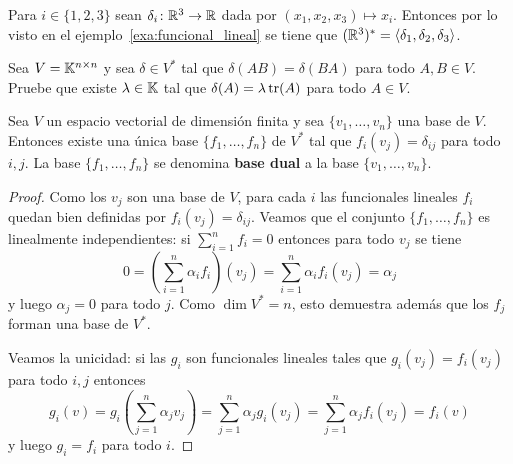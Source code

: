 \begin{example}
    Para $i\in\{1,2,3\}$ sean $\delta_i\colon\mathbb{R}^3\to\mathbb{R}$ dada por
    $(x_1,x_2,x_3)\mapsto x_i$. Entonces por lo visto en el
    ejemplo~\ref{exa:funcional_lineal} se tiene que 
    $(\mathbb{R}^3)^*=\langle\delta_1,\delta_2,\delta_3\rangle$.
\end{example}

\begin{xca}
    \label{xca:traza}
    Sea $V=\mathbb{K}^{n\times n}$ y sea $\delta\in V^*$ tal que
    $\delta(AB)=\delta(BA)$ para todo $A,B\in V$. Pruebe que existe
    $\lambda\in\mathbb{K}$ tal que $\delta(A)=\lambda\operatorname{tr}(A)$ para todo $A\in V$. 
\end{xca}

\begin{prop}
	Sea $V$ un espacio vectorial de dimensión finita y sea $\{v_1,\dots,v_n\}$
	una base de $V$. Entonces existe una única base $\{f_1,\dots,f_n\}$ de
	$V^*$ tal que $f_i(v_j)=\delta_{ij}$ para todo $i,j$. La base
	$\{f_1,\dots,f_n\}$ se denomina \textbf{base dual} a la base
	$\{v_1,\dots,v_n\}$.

	\begin{proof}
        Como los $v_j$ son una base de $V$, para cada $i$ las funcionales
        lineales $f_i$ quedan bien definidas por $f_i(v_j)=\delta_{ij}$. Veamos
        que el conjunto $\{f_1,\dots,f_n\}$ es linealmente independientes: si
        $\sum_{i=1}^n f_i=0$ entonces para todo $v_j$ se tiene
		\[
			0=\left(\sum_{i=1}^n \alpha_if_i\right)(v_j)=\sum_{i=1}^n \alpha_if_i(v_j)=\alpha_j
		\]
		y luego $\alpha_j=0$ para todo $j$. Como $\dim V^*=n$, esto demuestra
		además que los $f_j$ forman una base de $V^*$.

		Veamos la unicidad: si las $g_i$ son funcionales lineales tales que
		$g_i(v_j)=f_i(v_j)$ para todo $i,j$ entonces 
		\[
		g_i(v)
		=g_i\left(\sum_{j=1}^n \alpha_jv_j\right)
		=\sum_{j=1}^n\alpha_jg_i(v_j)
		=\sum_{j=1}^n \alpha_jf_i(v_j)=f_i(v)
		\]
		y luego $g_i=f_i$ para todo $i$.
	\end{proof}
\end{prop}


